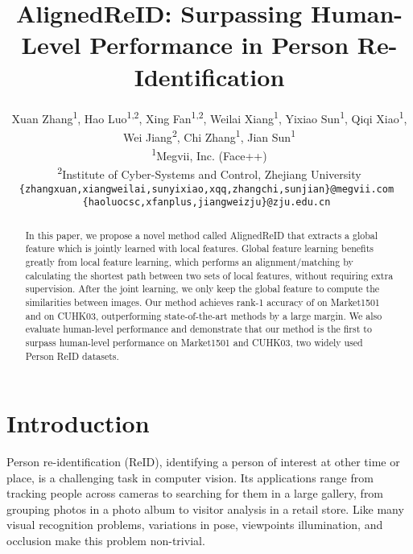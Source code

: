 \documentclass[10pt,twocolumn,letterpaper]{article}
\begin{document}
\title{AlignedReID: Surpassing Human-Level Performance in Person Re-Identification}

\author{	 Xuan Zhang\textsuperscript{1}\footnotemark[1] ,
        		Hao Luo\textsuperscript{1,2}\footnotemark[1] \footnotemark[2] ,
		Xing Fan\textsuperscript{1,2}\footnotemark[2] ,
		Weilai Xiang\textsuperscript{1}, 
        		Yixiao Sun\textsuperscript{1},
		Qiqi Xiao\textsuperscript{1}, \\
		Wei Jiang\textsuperscript{2}, 
	    	Chi Zhang\textsuperscript{1},
		Jian Sun\textsuperscript{1}\\
\textsuperscript{1}Megvii, Inc. (Face++)\\
\textsuperscript{2}Institute of Cyber-Systems and Control, Zhejiang University\\
{  \tt\small\{zhangxuan,xiangweilai,sunyixiao,xqq,zhangchi,sunjian\}@megvii.com } \\
{ \tt\small\{haoluocsc,xfanplus,jiangweizju\}@zju.edu.cn  } 
}




\maketitle

\renewcommand{\thefootnote}{\fnsymbol{footnote}}

\begin{abstract}
In this paper, we propose a novel method called AlignedReID that extracts a global feature which is jointly learned with local features.
Global feature learning benefits greatly from local feature learning, which performs an alignment/matching by calculating the shortest path between two sets of local features, without requiring extra supervision. After the joint learning, we only keep the global feature to compute the similarities between images. Our method achieves rank-1 accuracy of  on Market1501 and  on CUHK03, outperforming state-of-the-art methods by a large margin. We also evaluate human-level performance and demonstrate that our method is the first to surpass human-level performance on Market1501 and CUHK03, two widely used Person ReID datasets.
\end{abstract}

\section{Introduction}
\label{introduction}
Person re-identification (ReID), identifying a person of interest at other time or place, is a challenging task in computer vision.
Its applications range from tracking people across cameras to searching for them in a large gallery, from grouping photos in a photo album to visitor analysis in a retail store. Like many visual recognition problems, variations in pose, viewpoints illumination, and occlusion make this problem non-trivial.
\end{document}
